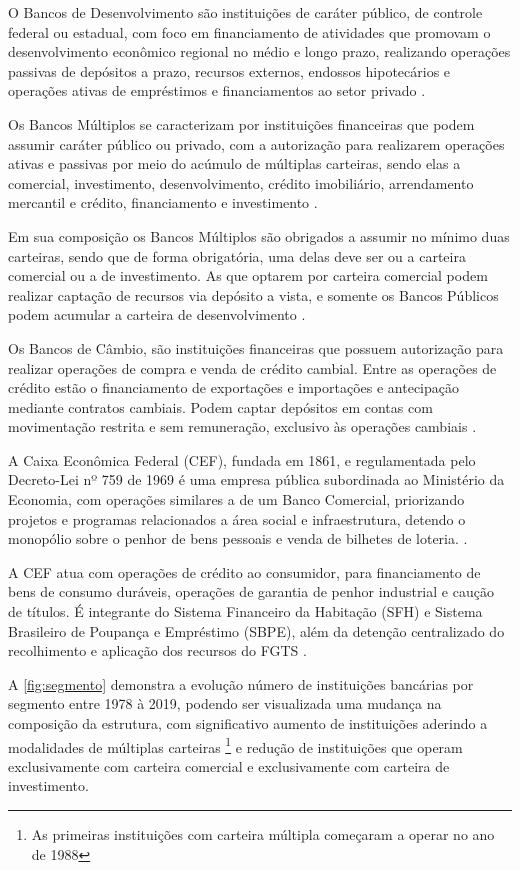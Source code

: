 \documentclass[12pt,12pt,openright,oneside,a4paper,chapter=TITLE,section=TITLE,subsection=TITLE,subsubsection=TITLE,english,french,spanish,portugues,sumario=tradicional]{abntex2}
\begin{document}
O Bancos de Desenvolvimento são instituições de caráter público, de controle federal ou estadual, com foco em financiamento de atividades que promovam o desenvolvimento econômico regional no médio e longo prazo, realizando operações passivas de depósitos a prazo, recursos externos, endossos hipotecários e operações ativas de empréstimos e financiamentos ao setor privado \cite{Res:394:1976}.

Os Bancos Múltiplos se caracterizam por instituições financeiras que podem assumir caráter público ou privado, com a autorização para realizarem operações ativas e passivas por meio do acúmulo de múltiplas carteiras, sendo elas a comercial, investimento, desenvolvimento, crédito imobiliário, arrendamento mercantil e crédito, financiamento e investimento \cite{Res:2099:1994}.

Em sua composição os Bancos Múltiplos são obrigados a assumir no mínimo duas carteiras, sendo que de forma obrigatória, uma delas deve ser ou a carteira comercial ou a de investimento. As que optarem por carteira comercial podem realizar captação de recursos via depósito a vista, e somente os Bancos Públicos podem acumular a carteira de desenvolvimento \cite{Res:2099:1994}.

Os Bancos de Câmbio, são instituições financeiras que possuem autorização para realizar operações de compra e venda de crédito cambial. Entre as operações de crédito estão o financiamento de exportações e importações e antecipação mediante contratos cambiais. Podem captar depósitos em contas com movimentação restrita e sem remuneração, exclusivo às operações cambiais \cite{Res:3426:2006}.

A Caixa Econômica Federal (CEF), fundada em 1861, e regulamentada pelo Decreto-Lei nº 759 de 1969 é uma empresa pública subordinada ao Ministério da Economia, com operações similares a de um Banco Comercial, priorizando projetos e programas relacionados a área social e infraestrutura, detendo o monopólio sobre o penhor de bens pessoais e venda de bilhetes de loteria. \cite{DL:759:1969}.

A CEF atua com operações de crédito ao consumidor, para financiamento de bens
de consumo duráveis, operações de garantia de penhor industrial e caução de
títulos. É integrante do Sistema Financeiro da Habitação (SFH) e Sistema
Brasileiro de Poupança e Empréstimo (SBPE), além da detenção centralizado do
recolhimento e aplicação dos recursos do FGTS \cite{DL:759:1969}.

A \autoref{fig:segmento} demonstra a evolução número de instituições bancárias
por segmento entre 1978 à 2019, podendo ser visualizada uma mudança na
composição da estrutura, com significativo aumento de instituições aderindo a
modalidades de múltiplas carteiras \footnote{As primeiras instituições com
carteira múltipla começaram a operar no ano de 1988} e redução de instituições que operam exclusivamente com carteira comercial e exclusivamente com carteira
de investimento.
\end{document}
